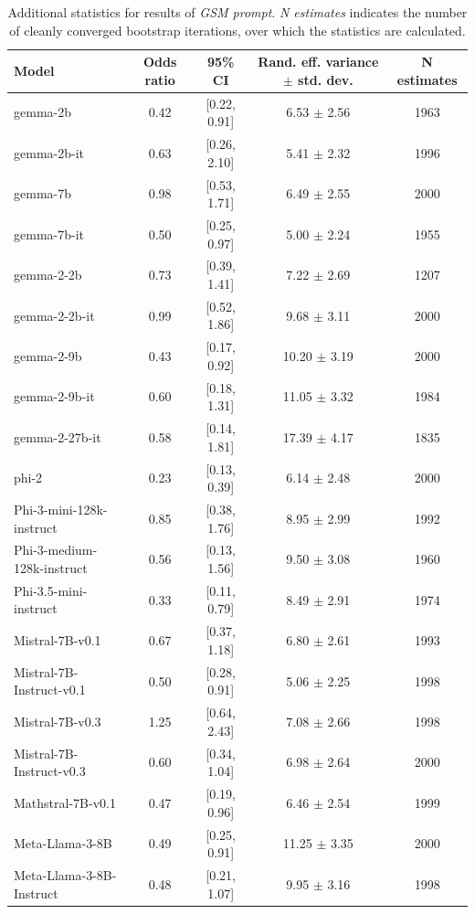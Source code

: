 \documentclass[11pt]{article}
\begin{document}
\begin{table}[H]
\centering
\small
\begin{tabular}{lcccc}
\toprule
Model & Odds ratio & 95\% CI & Rand. eff. variance $\pm$ std. dev. & N estimates \\
\midrule
gemma-2b & 0.42 & [0.22, 0.91] & 6.53 $\pm$ 2.56 & 1963 \\
gemma-2b-it & 0.63 & [0.26, 2.10] & 5.41 $\pm$ 2.32 & 1996 \\
gemma-7b & 0.98 & [0.53, 1.71] & 6.49 $\pm$ 2.55 & 2000 \\
gemma-7b-it & 0.50 & [0.25, 0.97] & 5.00 $\pm$ 2.24 & 1955 \\
gemma-2-2b & 0.73 & [0.39, 1.41] & 7.22 $\pm$ 2.69 & 1207 \\
gemma-2-2b-it & 0.99 & [0.52, 1.86] & 9.68 $\pm$ 3.11 & 2000 \\
gemma-2-9b & 0.43 & [0.17, 0.92] & 10.20 $\pm$ 3.19 & 2000 \\
gemma-2-9b-it & 0.60 & [0.18, 1.31] & 11.05 $\pm$ 3.32 & 1984 \\
gemma-2-27b-it & 0.58 & [0.14, 1.81] & 17.39 $\pm$ 4.17 & 1835 \\
phi-2 & 0.23 & [0.13, 0.39] & 6.14 $\pm$ 2.48 & 2000 \\
Phi-3-mini-128k-instruct & 0.85 & [0.38, 1.76] & 8.95 $\pm$ 2.99 & 1992 \\
Phi-3-medium-128k-instruct & 0.56 & [0.13, 1.56] & 9.50 $\pm$ 3.08 & 1960 \\
Phi-3.5-mini-instruct & 0.33 & [0.11, 0.79] & 8.49 $\pm$ 2.91 & 1974 \\
Mistral-7B-v0.1 & 0.67 & [0.37, 1.18] & 6.80 $\pm$ 2.61 & 1993 \\
Mistral-7B-Instruct-v0.1 & 0.50 & [0.28, 0.91] & 5.06 $\pm$ 2.25 & 1998 \\
Mistral-7B-v0.3 & 1.25 & [0.64, 2.43] & 7.08 $\pm$ 2.66 & 1998 \\
Mistral-7B-Instruct-v0.3 & 0.60 & [0.34, 1.04] & 6.98 $\pm$ 2.64 & 2000 \\
Mathstral-7B-v0.1 & 0.47 & [0.19, 0.96] & 6.46 $\pm$ 2.54 & 1999 \\
Meta-Llama-3-8B & 0.49 & [0.25, 0.91] & 11.25 $\pm$ 3.35 & 2000 \\
Meta-Llama-3-8B-Instruct & 0.48 & [0.21, 1.07] & 9.95 $\pm$ 3.16 & 1998 \\
\bottomrule
\end{tabular}
\caption{Additional statistics for results of \textit{GSM prompt}. \textit{N estimates} indicates the number of cleanly converged bootstrap iterations, over which the statistics are calculated.}
\label{tab:GSM-stats}
\end{table}
\end{document}

